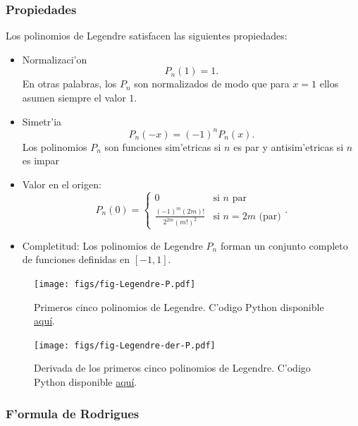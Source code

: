 \subsubsection{Propiedades}
Los polinomios de Legendre satisfacen las siguientes propiedades:
\begin{itemize}
\item Normalizaci'on
\begin{equation}
     P_n(1) = 1.
\end{equation}
En otras palabras, los $P_n$ son normalizados de modo que para $x=1$ ellos
asumen siempre el valor $1$.
 \item Simetr'ia
\begin{equation}
P_n(-x) = (-1)^n P_n(x).
\end{equation}
Los polinomios $P_n$ son funciones sim'etricas si $n$ es par y antisim'etricas
si $n$ es impar

\item Valor en el origen:
\begin{equation}\label{Pn0}
P_n(0)=\left\{\begin{array}{cl}
0 & \text{si } n \text{ par} \\
\frac{(-1)^m(2m)!}{2^{2m}(m!)^2} & \text{si } n=2m \text{ (par)}
\end{array}\right. .
\end{equation}

\item Completitud: Los polinomios de Legendre $P_n$ forman un conjunto
completo de funciones definidas en $[-1,1]$.
 \end{itemize}

\begin{figure}[H]
\centering
\texttt{[image: figs/fig-Legendre-P.pdf]}
\caption{Primeros cinco polinomios de Legendre. C'odigo Python disponible \href{https://github.com/gfrubi/FM2/blob/master/figuras-editables/fig-Legendre.py}{aqu\'i}.}
\label{fig-Pn}
\end{figure}

\begin{figure}[H]
\centering
\texttt{[image: figs/fig-Legendre-der-P.pdf]}
\caption{Derivada de los primeros cinco polinomios de Legendre. C'odigo Python disponible \href{https://github.com/gfrubi/FM2/blob/master/figuras-editables/fig-Legendre.py}{aqu\'i}.}
\label{fig-Pnp}
\end{figure}



\subsubsection{F'ormula de Rodrigues}

